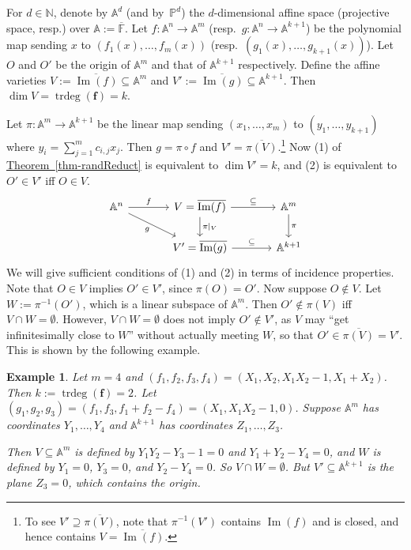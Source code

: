\documentclass[11pt]{article}
\numberwithin{equation}{section}
\theoremstyle{definition}
\theoremstyle{plain}
\newcommand{\N}{\mathbb N}
\newcommand{\expref}[2]{\hyperref[#2]{#1~\ref{#2}}}
\newtheorem{exmp}{Example}
\newcommand{\F}{\mathbb{F}}
\newcommand{\aff}{\mathbb{A}}
\newcommand{\proj}{\mathbb{P}}
\DeclareMathOperator{\im}{\mathrm{Im}}
\DeclareMathOperator{\trdeg}{\mathrm{trdeg}}
\newcommand{\ol}[1]{\overline{#1}}
\begin{document}
For $d\in\N$, denote by $\aff^d$
%
(and by~$\proj^d$)
the $d$-dimensional affine space
%
(projective space, resp.) over $\aff:=\ol{\F}$.
Let $f: \aff^n\to \aff^m$ (resp.~$g: \aff^n\to \aff^{k+1}$)
be the polynomial map sending $x$ to $(f_1(x),\dots,f_m(x))$
(resp.~$(g_1(x),\dots,g_{k+1}(x))$). Let $O$ and $O'$ be the
origin of $\aff^m$ and that of $\aff^{k+1}$ respectively.
Define the affine varieties $V:= \overline{\im(f)}\subseteq \aff^m$
and $V':= \overline{\im(g)}\subseteq \aff^{k+1}$. 
Then $\dim V= \trdeg(\mathbf f) = k$.

Let $\pi: \aff^m\to \aff^{k+1}$ be the linear map sending $(x_1,\dots,x_m)$ to $(y_1,\dots,y_{k+1})$ where $y_i= \sum_{j=1}^m c_{i,j} x_j$.
Then $g= \pi\circ f$ and $V'= \overline{\pi(V)}$.\footnote{To see $V'\supseteq\overline{\pi(V)}$, note that $\pi^{-1}(V')$ contains $\im(f)$ and is closed, and hence contains $V=\overline{\im(f)}$.}
 Now (1) of  \expref{Theorem}{thm-randReduct} is equivalent to $\dim V'=k$, and (2) is equivalent to $O'\in V'$ iff  $O\in V$.
\[
\begin{tikzcd}[column sep=large]
\aff^n \arrow{r}{f} \arrow[swap]{rd}{g}
& V= \overline{\im(f)}  \arrow{r}{\subseteq} \arrow{d}{\pi|_V} & \aff^m \arrow{d}{\pi}\\
& V'= \overline{\im(g)} \arrow{r}{\subseteq} & \aff^{k+1}
\end{tikzcd}
\] 
 We will give sufficient conditions of (1) and (2) in terms of incidence properties.
 Note that $O\in V$ implies $O'\in V'$, since $\pi(O)=O'$. Now suppose $O\not\in V$. Let $W:= \pi^{-1}(O')$, which is a linear  subspace of $\aff^m$.
  Then $O'\not\in \pi(V)$ iff $V\cap W=\emptyset$. However, $V\cap W=\emptyset$ does not imply $O'\not\in V'$, as $V$ may  ``get infinitesimally close to $W$''  without actually meeting $W$, so that $O'\in\overline{\pi(V)}=V'$. This is shown by the following 
   example. %

  
    \begin{exmp}\label{exmp_reduction}
Let $m=4$ and $(f_1,f_2,f_3,f_4)=(X_1,X_2,X_1 X_2-1, X_1+X_2)$. Then $k:=\trdeg(\mathbf f)= 2$.
  Let $(g_1,g_2,g_3)=(f_1,f_3,f_1+f_2-f_4)=(X_1,X_1 X_2-1,0)$.
  Suppose $\aff^m$ has coordinates $Y_1,\dots,Y_4$ and $\aff^{k+1}$ has coordinates $Z_1,\dots,Z_3$.

Then $V\subseteq\aff^m$ is defined by $Y_1Y_2-Y_3-1=0$ and $Y_1+Y_2-Y_4=0$, and $W$ is defined by $Y_1=0$, $Y_3=0$, and $Y_2-Y_4=0$.
So $V\cap W=\emptyset$.  But $V'\subseteq\aff^{k+1}$ is the plane $Z_3=0$, which contains the origin.
  \end{exmp}
  
\end{document}
